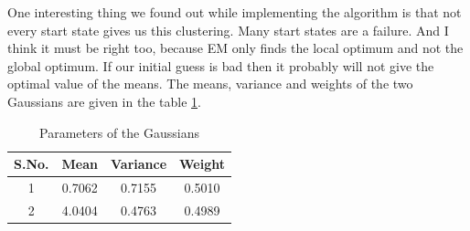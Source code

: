 \documentclass[journal, compsoc]{IEEEtran}
\begin{document}
One interesting thing we found out while implementing the algorithm is that not every start state gives us this clustering. Many start states are a failure.
And I think it must be right too, because EM only finds the local optimum and not the global optimum. If our initial guess is bad then it probably will not
give the optimal value of the means. The means, variance and weights of the two Gaussians are given in the table \ref{table:parameters}.

\begin{table}[!h]
\renewcommand{\arraystretch}{0.4}
\caption{Parameters of the Gaussians}
\label{table:parameters}
\centering
\begin{tabular}{|c|c|c|c|}
\hline
{\bfseries S.No.} & {\bfseries Mean} & {\bfseries Variance} & {\bfseries Weight}\\
\hline \hline
1 & 0.7062 & 0.7155 & 0.5010\\
\hline
2 & 4.0404 & 0.4763 & 0.4989\\
\hline
\end{tabular}
\end{table}
\nocite{Do2008}
\nocite{HMM_Stamp}

\end{document}
